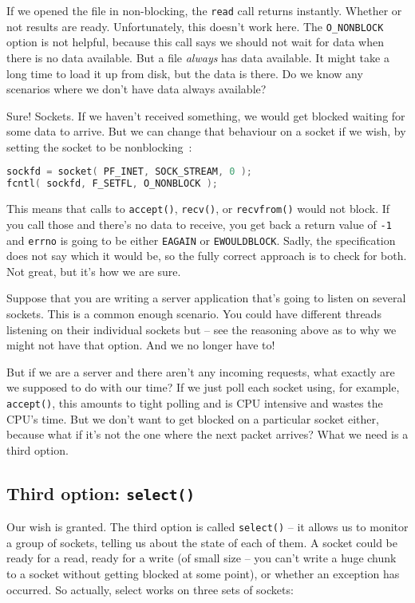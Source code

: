 If we opened the file in non-blocking, the \texttt{read} call returns instantly. Whether or not results are ready. Unfortunately, this doesn't work here. The \texttt{O\_NONBLOCK} option is not helpful, because this call says we should not wait for data when there is no data available. But a file \textit{always} has data available. It might take a long time to load it up from disk, but the data is there. Do we know any scenarios where we don't have data always available?

Sure! Sockets. If we haven't received something, we would get blocked waiting for some data to arrive. But we can change that behaviour on a socket if we wish, by setting the socket to be nonblocking~\cite{getaddrinfo}:

\begin{lstlisting}[language=C]
sockfd = socket( PF_INET, SOCK_STREAM, 0 );
fcntl( sockfd, F_SETFL, O_NONBLOCK );
\end{lstlisting}

This means that calls to \texttt{accept()}, \texttt{recv()}, or \texttt{recvfrom()} would not block. If you call those and there's no data to receive, you get back a return value of \texttt{-1} and \texttt{errno} is going to be either \texttt{EAGAIN} or \texttt{EWOULDBLOCK}. Sadly, the specification does not say which it would be, so the fully correct approach is to check for both. Not great, but it's how we are sure.

Suppose that you are writing a server application that's going to listen on several sockets. This is a common enough scenario. You could have different threads listening on their individual sockets but -- see the reasoning above as to why we might not have that option. And we no longer have to! 

But if we are a server and there aren't any incoming requests, what exactly are we supposed to do with our time? If we just poll each socket using, for example, \texttt{accept()}, this amounts to tight polling and is CPU intensive and wastes the CPU's time. But we don't want to get blocked on a particular socket either, because what if it's not the one where the next packet arrives? What we need is a third option.

\subsection*{Third option: \texttt{select()}} Our wish is granted. The third option is called \texttt{select()} -- it allows us to monitor a group of sockets, telling us about the state of each of them. A socket could be ready for a read, ready for a write (of small size -- you can't write a huge chunk to a socket without getting blocked at some point), or whether an exception has occurred. So actually, select works on three sets of sockets:

